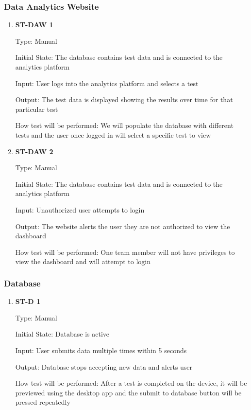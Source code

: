 \documentclass[12pt, titlepage]{article}
\begin{document}
\subsubsection{Data Analytics Website}
\begin{enumerate}
  
  \item{\bf{ST-DAW 1}}
  
  Type: Manual
            
  Initial State: The database contains test data and is connected to the analytics platform
            
  Input: User logs into the analytics platform and selects a test
            
  Output: The test data is displayed showing the results over time for that particular test
  
            
  How test will be performed: We will populate the database with different tests and the user once logged in will select a specific test to view\\

  \item{\bf{ST-DAW 2}}
  
  Type: Manual
            
  Initial State: The database contains test data and is connected to the analytics platform
            
  Input: Unauthorized user attempts to login
            
  Output: The website alerts the user they are not authorized to view the dashboard
  
            
  How test will be performed: One team member will not have privileges to view the dashboard and will attempt to login\\

\end{enumerate}

\subsubsection{Database}

\begin{enumerate}
  
  \item{\bf{ST-D 1}}
  
  Type: Manual
            
  Initial State: Database is active
            
  Input: User submits data multiple times within 5 seconds
            
  Output: Database stops accepting new data and alerts user
            
  How test will be performed: After a test is completed on the device, it will be previewed using the desktop app and the submit to database button will be pressed repeatedly\\
\end{enumerate}
\end{document}
